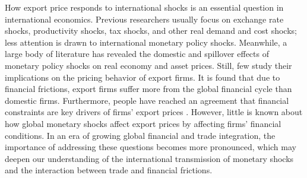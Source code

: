 How export price responds to international shocks is an essential question in international economics. Previous researchers usually focus on exchange rate shocks, productivity shocks, tax shocks, and other real demand and cost shocks; less attention is drawn to international monetary policy shocks. Meanwhile, a large body of literature has revealed the domestic and spillover effects of monetary policy shocks on real economy and asset prices. Still, few study their implications on the pricing behavior of export firms. It is found that due to financial frictions, export firms suffer more from the global financial cycle than domestic firms. Furthermore, people have reached an agreement that financial constraints are key drivers of firms' export prices \cite{manova2013credit}. However, little is known about how global monetary shocks affect export prices by affecting firms' financial conditions. In an era of growing global financial and trade integration, the importance of addressing these questions becomes more pronounced, which may deepen our understanding of the international transmission of monetary shocks and the interaction between trade and financial frictions.

